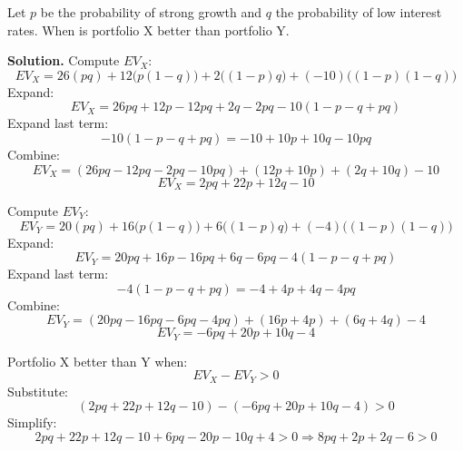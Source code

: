 \begin{ExamProblems}
		Let \(p\) be the probability of strong growth and \(q\) the probability of low interest rates.  
		When is portfolio X better than portfolio Y.
		
		\textbf{Solution.}
		Compute \(EV_X\):
		\[
		EV_X=26(pq)+12\bigl(p(1-q)\bigr)+2\bigl((1-p)q\bigr)+(-10)\bigl((1-p)(1-q)\bigr)
		\]
		Expand:
		\[
		EV_X=26pq + 12p - 12pq + 2q - 2pq - 10(1-p-q+pq)
		\]
		Expand last term:
		\[
		-10(1-p-q+pq)=-10 + 10p + 10q - 10pq
		\]
		Combine:
		\[
		EV_X=(26pq-12pq-2pq-10pq) + (12p+10p) + (2q+10q) - 10
		\]
		\[
		EV_X=2pq + 22p + 12q - 10
		\]
		
		Compute \(EV_Y\):
		\[
		EV_Y=20(pq)+16\bigl(p(1-q)\bigr)+6\bigl((1-p)q\bigr)+(-4)\bigl((1-p)(1-q)\bigr)
		\]
		Expand:
		\[
		EV_Y=20pq + 16p - 16pq + 6q - 6pq - 4(1-p-q+pq)
		\]
		Expand last term:
		\[
		-4(1-p-q+pq)=-4 + 4p + 4q - 4pq
		\]
		Combine:
		\[
		EV_Y=(20pq-16pq-6pq-4pq) + (16p+4p) + (6q+4q) - 4
		\]
		\[
		EV_Y=-6pq + 20p + 10q - 4
		\]
		
		Portfolio X better than Y when:
		\[
		EV_X-EV_Y>0
		\]
		Substitute:
		\[
		(2pq+22p+12q-10)-(-6pq+20p+10q-4)>0
		\]
		Simplify:
		\[
		2pq+22p+12q-10+6pq-20p-10q+4>0
		\Rightarrow 8pq+2p+2q-6>0
		\]
		
	\end{ExamProblems}


